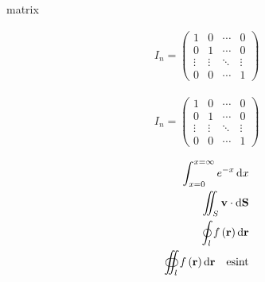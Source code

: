\documentclass[presentatie.tex]{subfiles}
\begin{document}
\begin{saveblock}{matrix}
	\begin{highlightblock}[gobble=8,linewidth=\textwidth,framexleftmargin=0.25em]
		\begin{align*}
			I_n = \begin{pmatrix}
				1 & 0 & \cdots & 0\\
				0 & 1 & \cdots & 0\\
				\vdots & \vdots & \ddots & \vdots\\
				0 & 0 & \cdots & 1
			\end{pmatrix}
		\end{align*}
	\end{highlightblock}
\end{saveblock}

\begin{frame}

	\begin{align*}
		I_n = \begin{pmatrix}
			1 & 0 & \cdots & 0\\
			0 & 1 & \cdots & 0\\
			\vdots & \vdots & \ddots & \vdots\\
			0 & 0 & \cdots & 1
		\end{pmatrix}
	\end{align*}
\end{frame}	


\begin{frame}
	
	\begin{align*}
		\int_{x=0}^{x=\infty}e^{-x}\dif x\\
		\iint_{S}\textbf{v}\cdot\dif \textbf{S}\\
		\oint_{l}f\left(\textbf{r}\right)\dif\textbf{r}\\
		\oiint_{l}f\left(\textbf{r}\right)\dif\textbf{r}\quad \mbox{esint}
	\end{align*}
\end{frame}
\end{document}
